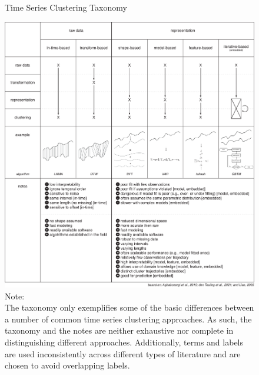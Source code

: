 \documentclass[man, 12pt, a4paper, floatsintext]{apa7}
\theoremstyle{break}
\theoremstyle{plain}
\newcommand{\fgrref}[2][]{\hyperref[#2]{Figure \ref*{#2}#1}}
\newcommand{\tblref}[2][]{\hyperref[#2]{Table \ref*{#2}#1}}
\begin{document}

\begin{figure}[!hbtp] %
  \caption{Time Series Clustering Taxonomy}
  \label{fig:tsClustTax}
  \centering\includegraphics[width=\textwidth]{figures/TS Cluster Flow/tsClustTax.pdf}
  \caption*{Note: \\
  The taxonomy only exemplifies some of the basic differences between a number of common time series clustering approaches. As such, the taxonomy and the notes are neither exhaustive nor complete in distinguishing different approaches. Additionally, terms and labels are used inconsistently across different types of literature and are chosen to avoid overlapping labels.}
\end{figure}
\end{document}
